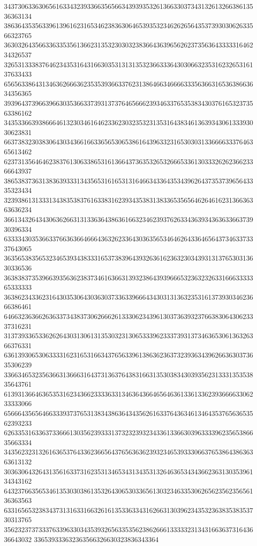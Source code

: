 34373063363065616334323933663565663439393532613663303734313261326638613536363134
38636435356339613961623165346238363064653935323462626564353739303062633566323765
36303264356633633535613662313532303032383664363965626237356364333331646234326537
32653133383764623435316431663035313131353236633364303066323531623265316137633433
65656338643134636266636235353936633762313864663466663335636631653638663634356365
39396437396639663035366337393137376465666239346337653538343037616532373563386162
34353366393866646132303461646233623032353231353164383461363934306133393030623831
66373832303830643034366166336565306538616439633231653030313366663337646365613462
62373135646462383761306338653161366437363532653266653361303332626236623366643937
38653837363138363933313435653161653131646634336435343962643735373965643335323434
32393861313331343835383761633831623934353831383365356564626461623136636363636234
36613432643430636266313133636438636166323462393762633436393436363366373930396334
63333430353663376636366466643632623364303635653464626433646564373463373337643065
36356538356532346539343833316537383964393263616236323034393131376530313630336536
36383837353966393563623837346163663139323864393966653236323263316663333365333333
36386234336231643035306430363037336339666434303131363235316137393034623666386461
64663236366263633734383730626662613330623439613037363932376638306430623337316231
31373933653362626430313061313530323130653339623337393137346365306136326366376331
63613930653063333162316531663437656339613863623637323936343962663630373635306239
33663465323563663136663164373136376438316631353038343039356231333135353835643761
61393136646365353162343662333363313463643664656463613361336239366663306233333066
65666435656466333937376531383438636434356261633764363461346435376563653562393233
62633531633637336661303562393331373232393234336133663039633339623565386635663334
34356232313261636537643362366564376563636239323465393330663765386438636363613132
30363064326431356163373162353134653431343531326463653434366236313035396134343162
64323766356534613530303861353264306530336561303234633530626562356235656136363563
63316565323834373131633166326161353363343162663130396234353236383538353730313765
35623237373337633963303435393265633535623862666133333231343166363731643636643032
336539333632363566326630323836343364
